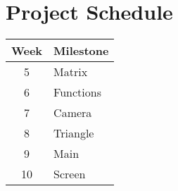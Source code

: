 \chapter*{Project Schedule}

\begin{tabular}{c | l}
Week & Milestone\\
\hline
5 & Matrix\\
6 & Functions\\
7 & Camera\\
8 & Triangle\\
9 & Main\\
10 & Screen\\
\end{tabular}
